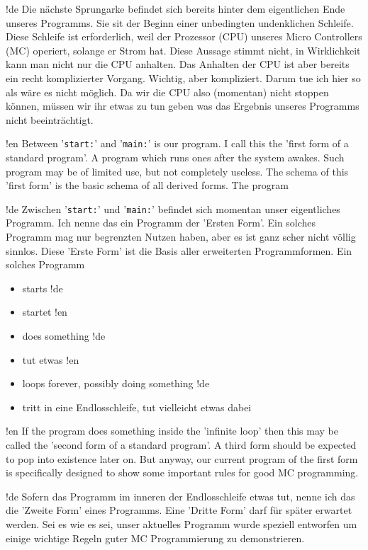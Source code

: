 !de Die nächste Sprungarke befindet sich bereits hinter dem eigentlichen Ende unseres Programms. Sie sit der Beginn einer unbedingten undenklichen Schleife. Diese Schleife ist erforderlich, weil der Prozessor (CPU) unseres Micro Controllers (MC) operiert, solange er Strom hat. Diese Aussage stimmt nicht, in Wirklichkeit kann man nicht nur die CPU anhalten. Das Anhalten der CPU ist aber bereits ein recht komplizierter Vorgang. Wichtig, aber kompliziert. Darum tue ich hier so als wäre es nicht möglich. Da wir die CPU also (momentan) nicht stoppen können, müssen wir ihr etwas zu tun geben was das Ergebnis unseres Programms nicht beeinträchtigt.



!en Between '\texttt{start:}' and '\texttt{main:}' is our program. I call this the 'first form of a standard program'. A program which runs ones after the system awakes. Such program may be of limited use, but not completely useless. The schema of this 'first form' is the basic schema of all derived forms. The program 

!de Zwischen '\texttt{start:}' und '\texttt{main:}' befindet sich momentan unser eigentliches Programm. Ich nenne das ein Programm der 'Ersten Form'. Ein solches Programm mag nur begrenzten Nutzen haben, aber es ist ganz scher nicht völlig sinnlos. Diese 'Erste Form' ist die Basis aller erweiterten Programmformen. Ein solches Programm

\begin{itemize}
!en   \item  starts
!de   \item  startet
!en   \item  does something
!de   \item  tut etwas
!en   \item  loops forever, possibly doing something
!de   \item  tritt in eine Endlosschleife, tut vielleicht etwas dabei
\end{itemize}




!en If the program does something inside the 'infinite loop' then this may be called the 'second form of a standard program'. A third form should be expected to pop into existence later on. But anyway, our current program of the first form is specifically designed to show some important rules for good MC programming.

!de Sofern das Programm im inneren der Endlosschleife etwas tut, nenne ich das die 'Zweite Form' eines Programms. Eine 'Dritte Form' darf für später erwartet werden. Sei es wie es sei, unser aktuelles Programm wurde speziell entworfen um einige wichtige Regeln guter MC Programmierung zu demonstrieren.


